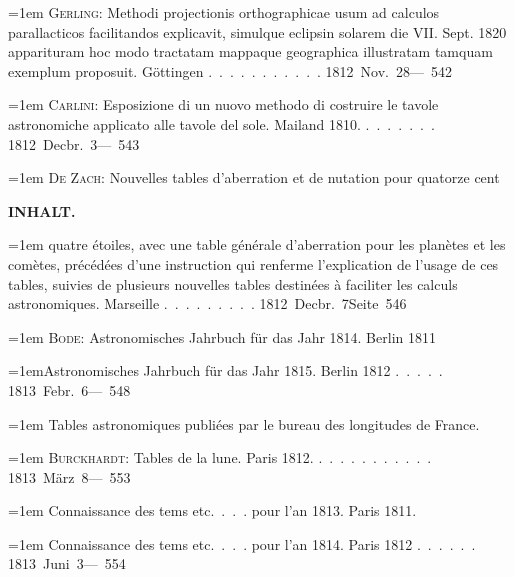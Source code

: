 \noindent\hangindent=1em \textsc{Gerling}: Methodi projectionis orthographicae usum ad calculos parallacticos facilitandos explicavit, simulque eclipsin solarem die VII. Sept. 1820 apparituram hoc modo tractatam mappaque geographica illustratam tamquam exemplum proposuit. Göttingen \mbox{.\ .\ .\ .\ .\ .\ .\ .\ .\ .\ .} \hfill\mbox{1812 Nov. 28}\quad\mbox{--- 542}\par\smallskip
\noindent\hangindent=1em \textsc{Carlini}: Esposizione di un nuovo methodo di costruire le tavole astronomiche applicato alle tavole del sole. Mailand 1810. \mbox{.\ .\ .\ .\ .\ .\ .} \hfill\mbox{1812 Decbr. 3}\quad\mbox{--- 543}\par\smallskip
\noindent\hangindent=1em \textsc{De Zach}: Nouvelles tables d'aberration et de nutation pour quatorze cent\par
\clearpage
{}
\noindent\makebox[10mm][l]{}%
\parbox[b]{\dimexpr\textwidth-20mm\relax}{\centering\small\textbf{INHALT.}}%
\par\nobreak\medskip
\noindent\hangindent=1em quatre étoiles, avec une table générale d'aberration pour les planètes et les comètes, précédées d'une instruction qui renferme l'explication de l'usage de ces tables, suivies de plusieurs nouvelles tables destinées à faciliter les calculs astronomiques. Marseille \mbox{.\ .\ .\ .\ .\ .\ .\ .\ .} \hfill\mbox{1812 Decbr. 7}\quad\mbox{Seite 546}\par\smallskip
\noindent\hangindent=1em \textsc{Bode}: Astronomisches Jahrbuch für das Jahr 1814. Berlin 1811\par\noindent\hangindent=1em\hspace{1em}Astronomisches Jahrbuch für das Jahr 1815. Berlin 1812 \mbox{.\ .\ .\ .\ .} \hfill\mbox{1813 Febr. 6}\quad\mbox{--- 548}\par\smallskip
\noindent\hangindent=1em Tables astronomiques publiées par le bureau des longitudes de France.\par\noindent\hangindent=1em \textsc{Burckhardt}: Tables de la lune. Paris 1812. \mbox{.\ .\ .\ .\ .\ .\ .\ .\ .\ .\ .} \hfill\mbox{1813 März 8}\quad\mbox{--- 553}\par\smallskip
\noindent\hangindent=1em Connaissance des tems etc.\ .\ .\ . pour l'an 1813. Paris 1811.\par\noindent\hangindent=1em Connaissance des tems etc.\ .\ .\ . pour l'an 1814. Paris 1812 \mbox{.\ .\ .\ .\ .\ .} \hfill\mbox{1813 Juni 3}\quad\mbox{--- 554}\par\smallskip
